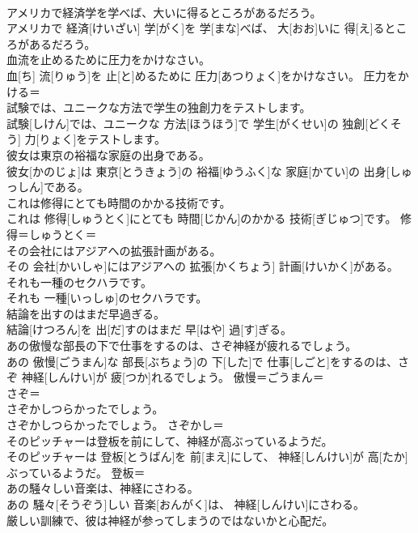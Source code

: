 \documentclass[8pt]{extreport}
\begin{document}
\begin{CJK}{UTF8}{min}
\\	アメリカで経済学を学べば、大いに得るところがあるだろう。	
\\	アメリカで 経済[けいざい] 学[がく]を 学[まな]べば、 大[おお]いに 得[え]るところがあるだろう。	
\\	血流を止めるために圧力をかけなさい。	
\\	血[ち] 流[りゅう]を 止[と]めるために 圧力[あつりょく]をかけなさい。	圧力をかける＝ 
\\	試験では、ユニークな方法で学生の独創力をテストします。	
\\	試験[しけん]では、ユニークな 方法[ほうほう]で 学生[がくせい]の 独創[どくそう] 力[りょく]をテストします。	
\\	彼女は東京の裕福な家庭の出身である。	
\\	彼女[かのじょ]は 東京[とうきょう]の 裕福[ゆうふく]な 家庭[かてい]の 出身[しゅっしん]である。	
\\	これは修得にとても時間のかかる技術です。	
\\	これは 修得[しゅうとく]にとても 時間[じかん]のかかる 技術[ぎじゅつ]です。	修得＝しゅうとく＝ 
\\	その会社にはアジアへの拡張計画がある。	
\\	その 会社[かいしゃ]にはアジアへの 拡張[かくちょう] 計画[けいかく]がある。	
\\	それも一種のセクハラです。	
\\	それも 一種[いっしゅ]のセクハラです。	
\\	結論を出すのはまだ早過ぎる。	
\\	結論[けつろん]を 出[だ]すのはまだ 早[はや] 過[す]ぎる。	
\\	あの傲慢な部長の下で仕事をするのは、さぞ神経が疲れるでしょう。	
\\	あの 傲慢[ごうまん]な 部長[ぶちょう]の 下[した]で 仕事[しごと]をするのは、さぞ 神経[しんけい]が 疲[つか]れるでしょう。	傲慢＝ごうまん＝ 
\\	さぞ＝ 
\\	さぞかしつらかったでしょう。	
\\	さぞかしつらかったでしょう。	さぞかし＝ 
\\	そのピッチャーは登板を前にして、神経が高ぶっているようだ。	
\\	そのピッチャーは 登板[とうばん]を 前[まえ]にして、 神経[しんけい]が 高[たか]ぶっているようだ。	登板＝ 
\\	あの騒々しい音楽は、神経にさわる。	
\\	あの 騒々[そうぞう]しい 音楽[おんがく]は、 神経[しんけい]にさわる。	
\\	厳しい訓練で、彼は神経が参ってしまうのではないかと心配だ。	

\end{CJK}
\end{document}
